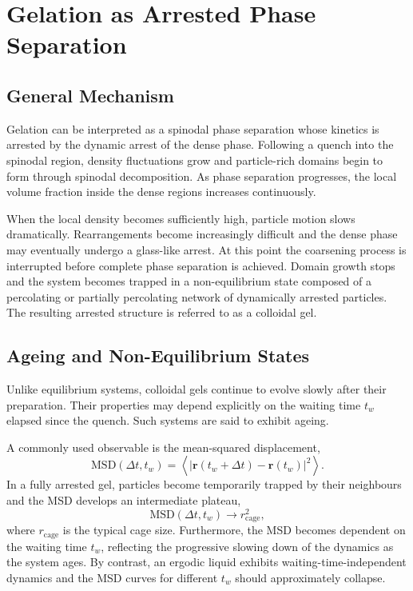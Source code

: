 \documentclass[11pt,a4paper]{article}
\begin{document}
\section{Gelation as Arrested Phase Separation}

\subsection{General Mechanism}

Gelation can be interpreted as a spinodal phase separation whose kinetics is arrested by the dynamic arrest of the dense phase. Following a quench into the spinodal region, density fluctuations grow and particle-rich domains begin to form through spinodal decomposition. As phase separation progresses, the local volume fraction inside the dense regions increases continuously.

When the local density becomes sufficiently high, particle motion slows dramatically. Rearrangements become increasingly difficult and the dense phase may eventually undergo a glass-like arrest. At this point the coarsening process is interrupted before complete phase separation is achieved. Domain growth stops and the system becomes trapped in a non-equilibrium state composed of a percolating or partially percolating network of dynamically arrested particles. The resulting arrested structure is referred to as a colloidal gel.

\subsection{Ageing and Non-Equilibrium States}

Unlike equilibrium systems, colloidal gels continue to evolve slowly after their preparation. Their properties may depend explicitly on the waiting time $t_w$ elapsed since the quench. Such systems are said to exhibit ageing.

A commonly used observable is the mean-squared displacement,
\begin{equation}
    \mathrm{MSD}(\Delta t,t_w)
    =
    \left\langle
    \left|
    \mathbf r(t_w+\Delta t)-\mathbf r(t_w)
    \right|^2
    \right\rangle.
    \label{eq:msd}
\end{equation}
In a fully arrested gel, particles become temporarily trapped by their neighbours and the MSD develops an intermediate plateau,
\begin{equation}
    \mathrm{MSD}(\Delta t,t_w) \rightarrow r_{\mathrm{cage}}^2,
\end{equation}
where $r_{\mathrm{cage}}$ is the typical cage size. Furthermore, the MSD becomes dependent on the waiting time $t_w$, reflecting the progressive slowing down of the dynamics as the system ages. By contrast, an ergodic liquid exhibits waiting-time-independent dynamics and the MSD curves for different $t_w$ should approximately collapse.
\end{document}
